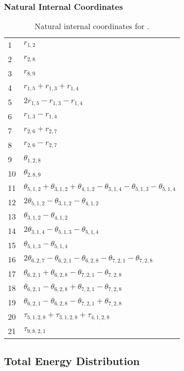 \documentclass[10pt,oneside]{article}
\begin{document}
\begin{table}[h!]
\subsubsection*{Natural Internal Coordinates}
\centering
\caption{Natural internal coordinates for .}
\small
\begin{tabular}{ll}
\toprule
  1   & $r_{1,2}$ \\
  2   & $r_{2,8}$ \\
  3   & $r_{8,9}$ \\
  4   & $r_{1,5} + r_{1,3} + r_{1,4}$ \\
  5   & $2r_{1,5} - r_{1,3} - r_{1,4}$ \\
  6   & $r_{1,3} - r_{1,4}$ \\
  7   & $r_{2,6} + r_{2,7}$ \\
  8   & $r_{2,6} - r_{2,7}$ \\
  9   & $\theta_{1,2,8}$ \\
  10  & $\theta_{2,8,9}$ \\
  11  & $\theta_{5,1,2} + \theta_{3,1,2} + \theta_{4,1,2} - \theta_{3,1,4} - \theta_{5,1,3} - \theta_{5,1,4}$ \\
  12  & $2\theta_{5,1,2} - \theta_{3,1,2} - \theta_{4,1,2}$ \\
  13  & $\theta_{3,1,2} - \theta_{4,1,2}$ \\
  14  & $2\theta_{3,1,4} - \theta_{5,1,3} - \theta_{5,1,4}$ \\
  15  & $\theta_{5,1,3} - \theta_{5,1,4}$ \\
  16  & $2\theta_{6,2,7} - \theta_{6,2,1} - \theta_{6,2,8} - \theta_{7,2,1} - \theta_{7,2,8}$ \\
  17  & $\theta_{6,2,1} + \theta_{6,2,8} - \theta_{7,2,1} - \theta_{7,2,8}$ \\
  18  & $\theta_{6,2,1} - \theta_{6,2,8} + \theta_{7,2,1} - \theta_{7,2,8}$ \\
  19  & $\theta_{6,2,1} - \theta_{6,2,8} - \theta_{7,2,1} + \theta_{7,2,8}$ \\
  20  & $\tau_{5,1,2,8} + \tau_{3,1,2,8} + \tau_{4,1,2,8}$ \\
  21  & $\tau_{9,8,2,1}$ \\
\bottomrule
\end{tabular}
\end{table}

\begin{table}
\subsection*{Total Energy Distribution}
\centering\end{table}
\end{document}
